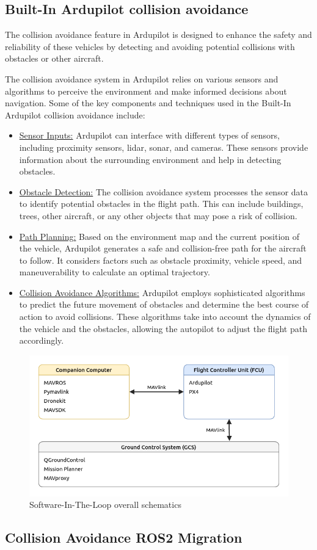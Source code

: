 \subsection{Built-In Ardupilot collision avoidance}
The collision avoidance feature in Ardupilot is designed to enhance the safety and reliability of these vehicles by detecting and avoiding potential collisions with obstacles or other aircraft.

The collision avoidance system in Ardupilot relies on various sensors and algorithms to perceive the environment and make informed decisions about navigation. Some of the key components and techniques used in the Built-In Ardupilot collision avoidance include:

\begin{itemize}
    \item \underline{Sensor Inputs:} Ardupilot can interface with different types of sensors, including proximity sensors, lidar, sonar, and cameras. These sensors provide information about the surrounding environment and help in detecting obstacles.
    \item \underline{Obstacle Detection:} The collision avoidance system processes the sensor data to identify potential obstacles in the flight path. This can include buildings, trees, other aircraft, or any other objects that may pose a risk of collision.
    \item \underline{Path Planning:} Based on the environment map and the current position of the vehicle, Ardupilot generates a safe and collision-free path for the aircraft to follow. It considers factors such as obstacle proximity, vehicle speed, and maneuverability to calculate an optimal trajectory.
    \item \underline{Collision Avoidance Algorithms:} Ardupilot employs sophisticated algorithms to predict the future movement of obstacles and determine the best course of action to avoid collisions. These algorithms take into account the dynamics of the vehicle and the obstacles, allowing the autopilot to adjust the flight path accordingly.
\end{itemize}

\begin{figure}[H]
    \centering
    \includegraphics[width=0.65\linewidth]{./projects/ardupilot/sitl_overall.png}
    \caption{Software-In-The-Loop overall schematics}
\end{figure}

\subsection{Collision Avoidance ROS2 Migration}

